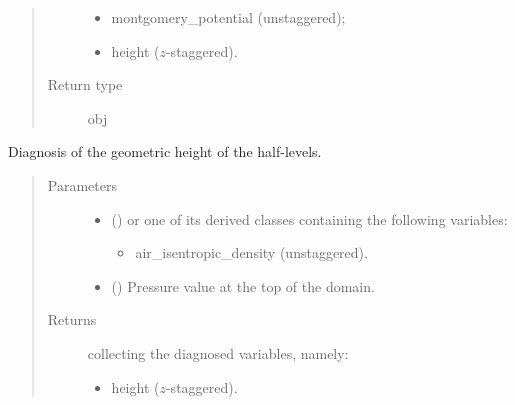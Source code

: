 \documentclass[letterpaper,10pt,english]{sphinxmanual}
\begin{document}
\begin{fulllineitems}
\begin{fulllineitems}
\begin{quote}
\begin{description}
\begin{itemize}
\item {} 
montgomery\_potential (unstaggered);

\item {} 
height (\(z\)-staggered).

\end{itemize}


\item[{Return type}] \leavevmode
obj

\end{description}\end{quote}

\end{fulllineitems}


\begin{fulllineitems}
\label{\detokenize{api:dycore.diagnostic_isentropic.DiagnosticIsentropic.get_height}}
Diagnosis of the geometric height of the half-levels.
\begin{quote}\begin{description}
\item[{Parameters}] \leavevmode\begin{itemize}
\item {} 
 () \textendash{} 
{\hyperref[\detokenize{api:storages.grid_data.GridData}]{}} or one of its derived classes containing the following variables:
\begin{itemize}
\item {} 
air\_isentropic\_density (unstaggered).

\end{itemize}


\item {} 
 () \textendash{} Pressure value at the top of the domain.

\end{itemize}

\item[{Returns}] \leavevmode

{\hyperref[\detokenize{api:storages.grid_data.GridData}]{}} collecting the diagnosed variables, namely:
\begin{itemize}
\item {} 
height (\(z\)-staggered).


\end{itemize}
\end{description}
\end{quote}
\end{fulllineitems}
\end{fulllineitems}
\end{document}
